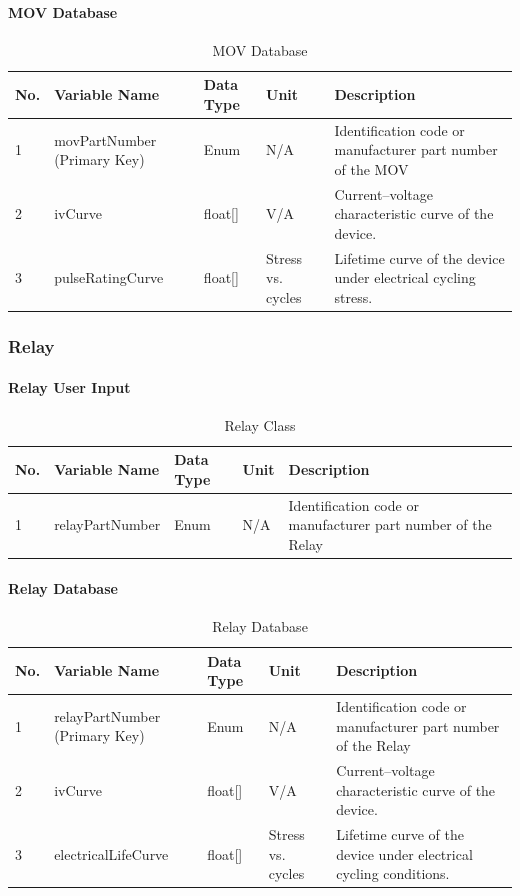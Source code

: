 \documentclass{article}
\begin{document}
\paragraph{MOV Database}
\begin{table}[h]
\centering
\caption{MOV Database}
\begin{tabular}{|l|l|l|l|p{6cm}|}
\hline
\textbf{No.} & \textbf{Variable Name} & \textbf{Data Type} & \textbf{Unit} & \textbf{Description} \\ \hline
1 & movPartNumber (Primary Key) & Enum & N/A & Identification code or manufacturer part number of the MOV \\ \hline
2 & ivCurve & float[] & V/A & Current–voltage characteristic curve of the device. \\ \hline
3 & pulseRatingCurve & float[] & Stress vs. cycles & Lifetime curve of the device under electrical cycling stress. \\ \hline
\end{tabular}
\end{table}

\subsubsection{Relay}
\paragraph{Relay User Input}
\begin{table}[h]
\centering
\caption{Relay Class}
\begin{tabular}{|l|l|l|l|p{6cm}|}
\hline
\textbf{No.} & \textbf{Variable Name} & \textbf{Data Type} & \textbf{Unit} & \textbf{Description} \\ \hline
1 & relayPartNumber & Enum & N/A & Identification code or manufacturer part number of the Relay \\ \hline
\end{tabular}
\end{table}

\paragraph{Relay Database}
\begin{table}[h]
\centering
\caption{Relay Database}
\begin{tabular}{|l|l|l|l|p{6cm}|}
\hline
\textbf{No.} & \textbf{Variable Name} & \textbf{Data Type} & \textbf{Unit} & \textbf{Description} \\ \hline
1 & relayPartNumber (Primary Key) & Enum & N/A & Identification code or manufacturer part number of the Relay \\ \hline
2 & ivCurve & float[] & V/A & Current–voltage characteristic curve of the device. \\ \hline
3 & electricalLifeCurve & float[] & Stress vs. cycles & Lifetime curve of the device under electrical cycling conditions. \\ \hline
\end{tabular}
\end{table}
\end{document}
